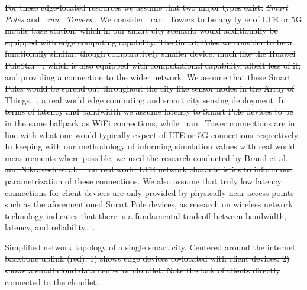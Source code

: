 \documentclass[draft,final]{vutinfth} %
\providecommand{\DIFdeltex}[1]{{\protect\color{red}\sout{#1}}}                      %
\providecommand{\DIFdelFL}[1]{\DIFdel{#1}} %
\providecommand{\DIFdel}[1]{\texorpdfstring{\DIFdeltex{#1}}{}} %
\begin{document}
\DIFdel{For these edge-located resources we assume that two major types exist: }\textit{\DIFdel{Smart Poles}} %
\DIFdel{and }\textit{\DIFdel{\mbox{%
\gls{ran} }\hskip0pt%
Towers}}%
\DIFdel{.
We consider \mbox{%
\gls{ran} }\hskip0pt%
Towers to be any type of LTE or 5G mobile base station, which in our smart city scenario would additionally be equipped with edge computing capability.
The Smart Poles we consider to be a functionally similar, though comparatively smaller device, much like the Huawei PoleStar\mbox{%
\cite{huaweiPolestar}}\hskip0pt%
, which is also equipped with computational capability, albeit less of it, and providing a connection to the wider network.
We assume that these Smart Poles would be spread out throughout the city like sensor nodes in the Array of Things\mbox{%
\cite{catlettArrayThingsScientific2017a}}\hskip0pt%
, a real world edge computing and smart city sensing deployment.
In terms of latency and bandwidth we assume latency to Smart Pole devices to be in the same ballpark as WiFi connections, while \mbox{%
\gls{ran} }\hskip0pt%
Tower connections are in line with what one would typically expect of LTE or 5G connections respectively.
In keeping with our methodology of informing simulation values with real world measurements where possible, we used the research conducted by Braud et al.\mbox{%
\cite{braudMulticarrierMeasurementStudy2019} }\hskip0pt%
and Nikravesh et al.\mbox{%
\cite{nikraveshMobileNetworkPerformance2014a} }\hskip0pt%
on real world LTE network characteristics to inform our parametrization of these connections.
We also assume that truly low latency connections for client devices are only provided by physically near access points such as the aforementioned Smart Pole devices, as research on wireless network technology indicates that there is a fundamental tradeoff between bandwidth, latency, and reliability\mbox{%
\cite{soretFundamentalTradeoffsReliability2014}}\hskip0pt%
.
}%

{%
\DIFdelFL{Simplified network topology of a single smart city. Centered around the internet backbone uplink (red), 1) shows edge devices co-located with client devices. 2) shows a small cloud data center or cloudlet. Note the lack of clients directly connected to the cloudlet.}}
\end{document}
